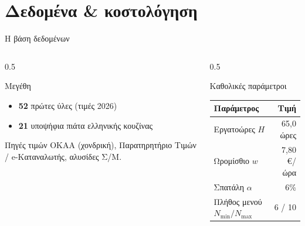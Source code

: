 \documentclass[aspectratio=169,11pt]{beamer}
\begin{document}
\section{Δεδομένα \& κοστολόγηση}
\begin{frame}{Η βάση δεδομένων}
  \begin{columns}[T]
    \begin{column}{0.5\textwidth}
      \begin{block}{Μεγέθη}
        \begin{itemize}
          \item \textbf{52} πρώτες ύλες (τιμές 2026)
          \item \textbf{21} υποψήφια πιάτα ελληνικής κουζίνας
        \end{itemize}
      \end{block}
      \begin{block}{Πηγές τιμών}
        \footnotesize ΟΚΑΑ (χονδρική), Παρατηρητήριο Τιμών / e-Καταναλωτής,
        αλυσίδες Σ/Μ.
      \end{block}
    \end{column}
    \begin{column}{0.5\textwidth}
      \begin{block}{Καθολικές παράμετροι}
        \footnotesize
        \begin{tabular}{@{}lr@{}}
          \toprule
          Παράμετρος & Τιμή \\ \midrule
          Εργατοώρες $H$ & 65,0 ώρες \\
          Ωρομίσθιο $w$ & 7,80 €/ώρα \\
          Σπατάλη $\alpha$ & 6\% \\
          Πλήθος μενού $N_{\min}/N_{\max}$ & 6 / 10 \\
          \bottomrule
        \end{tabular}
      \end{block}
    \end{column}
  \end{columns}
\end{frame}
\end{document}
